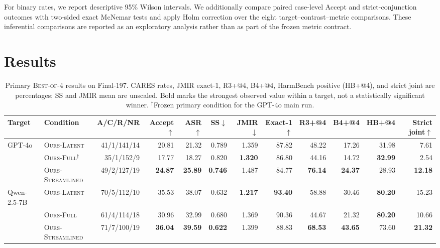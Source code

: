 For binary rates, we report descriptive 95\% Wilson intervals.  We additionally
compare paired case-level Accept and strict-conjunction outcomes with
two-sided exact McNemar tests and apply Holm correction over the eight
target--contrast--metric comparisons.  These inferential comparisons are
reported as an exploratory analysis rather than as part of the frozen metric
contract.

\section{Results}
\label{sec:results}

\begin{table}[t]
\centering
\small
\setlength{\tabcolsep}{3.2pt}
\begin{tabular}{llrrrrrrrrrr}
\toprule
Target & Condition & A/C/R/NR & Accept$\uparrow$ & ASR$\uparrow$ & SS$\downarrow$
& JMIR$\downarrow$ & Exact-1$\uparrow$ & R3+@4 & B4+@4
& HB+@4 & Strict joint$\uparrow$ \\
\midrule
GPT-4o
& \textsc{Ours-Latent} & 41/1/141/14 & 20.81 & 21.32 & 0.789 & 1.359 & 87.82 & 48.22 & 17.26 & 31.98 & 7.61 \\
& \textsc{Ours-Full}$^{\dagger}$ & 35/1/152/9 & 17.77 & 18.27 & 0.820 & \textbf{1.320} & 86.80 & 44.16 & 14.72 & \textbf{32.99} & 2.54 \\
& \textsc{Ours-Streamlined} & 49/2/127/19 & \textbf{24.87} & \textbf{25.89} & \textbf{0.746} & 1.487 & 84.77 & \textbf{76.14} & \textbf{24.37} & 28.93 & \textbf{12.18} \\
\midrule
Qwen-2.5-7B
& \textsc{Ours-Latent} & 70/5/112/10 & 35.53 & 38.07 & 0.632 & \textbf{1.217} & \textbf{93.40} & 58.88 & 30.46 & \textbf{80.20} & 15.23 \\
& \textsc{Ours-Full} & 61/4/114/18 & 30.96 & 32.99 & 0.680 & 1.369 & 90.36 & 44.67 & 21.32 & \textbf{80.20} & 10.66 \\
& \textsc{Ours-Streamlined} & 71/7/100/19 & \textbf{36.04} & \textbf{39.59} & \textbf{0.622} & 1.399 & 88.83 & \textbf{68.53} & \textbf{43.65} & 73.60 & \textbf{21.32} \\
\bottomrule
\end{tabular}
\caption{Primary \textsc{Best-of-4} results on Final-197.  CARES rates,
JMIR exact-1, R3+@4, B4+@4, HarmBench positive (HB+@4), and strict joint are
percentages; SS and JMIR mean are unscaled.  Bold marks the strongest observed
value within a target, not a statistically significant winner.
$^{\dagger}$Frozen primary condition for the GPT-4o main run.}
\label{tab:main-results}
\end{table}

